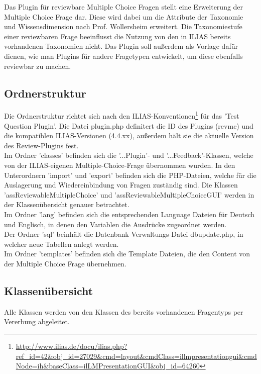 \documentclass[a4paper]{scrreprt}
\begin{document}
Das Plugin für reviewbare Multiple Choice Fragen stellt eine Erweiterung der Multiple Choice Frage dar. 
Diese wird dabei um die Attribute der Taxonomie und Wissensdimension nach Prof. Wollersheim erweitert. 
Die Taxonomiestufe einer reviewbaren Frage beeinflusst die Nutzung von den in ILIAS bereits vorhandenen Taxonomien nicht.
Das Plugin soll außerdem als Vorlage dafür dienen, wie man Plugins für andere Fragetypen entwickelt, um diese ebenfalls reviewbar zu machen. \\

\subsection{Ordnerstruktur}

Die Ordnerstruktur richtet sich nach den ILIAS-Konventionen\footnote{\url{http://www.ilias.de/docu/ilias.php?ref_id=42&obj_id=27029&cmd=layout&cmdClass=illmpresentationgui&cmdNode=ih&baseClass=ilLMPresentationGUI&obj_id=64260}} für das 'Test Question Plugin'. 
Die Datei plugin.php definitert die ID des Plugins (revmc) und die kompatiblen ILIAS-Versionen (4.4.xx), außerdem hält sie die aktuelle Version des Review-Plugins fest.\\
Im Ordner 'classes' befinden sich die '...Plugin'- und '...Feedback'-Klassen, welche von der ILIAS-eigenen Multiple-Choice-Frage übernommen wurden. 
In den Unterordnern 'import' und 'export' befinden sich die PHP-Dateien, welche für die Auslagerung und Wiedereinbindung von Fragen zuständig sind. 
Die Klassen 'assReviewableMultipleChoice' und 'assReviewableMultipleChoiceGUI' werden in der Klassenübersicht genauer betrachtet.\\
Im Ordner 'lang' befinden sich die entsprechenden Language Dateien für Deutsch und Englisch, in denen den Variablen die Ausdrücke zugeordnet werden.\\
Der Ordner 'sql' beinhält die Datenbank-Verwaltungs-Datei dbupdate.php, in welcher neue Tabellen anlegt werden.\\
Im Ordner 'templates' befinden sich die Template Dateien, die den Content von der Multiple Choice Frage übernehmen.\\

\subsection{Klassenübersicht}

Alle Klassen werden von den Klassen des bereits vorhandenen Fragentyps per Vererbung abgeleitet.\\
\end{document}
